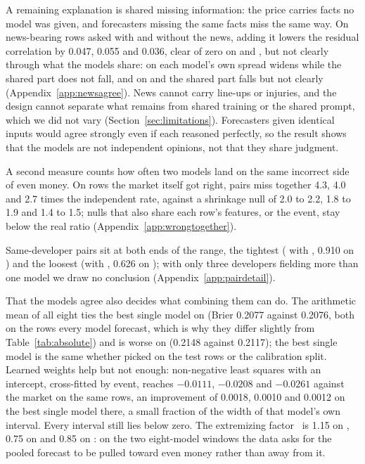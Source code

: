A remaining explanation is shared missing information: the price carries facts
no model was given, and forecasters missing the same facts miss the same way. On
news-bearing rows asked with and without the news, adding it lowers the
residual correlation by 0.047, 0.055 and 0.036, clear of zero on \winA and
\winB, but not clearly through what the models share: on \winA each model's own
spread widens while the shared part does not fall, and on \winB and \winC the
shared part falls but not clearly (Appendix~\ref{app:newsagree}). News cannot
carry line-ups or injuries, and the design cannot separate what remains from
shared training or the shared prompt, which we did not vary
(Section~\ref{sec:limitations}). Forecasters given identical inputs
would agree strongly even if each reasoned perfectly, so the result shows that
the models are not independent opinions, not that they share judgment.

A second measure counts how often two models land on the same incorrect side of
even money. On rows the market itself got right, pairs miss together 4.3, 4.0 and
2.7 times the independent rate, against a shrinkage null of 2.0 to 2.2, 1.8 to
1.9 and 1.4 to 1.5; nulls that also share each row's features, or the event,
stay below the real ratio (Appendix~\ref{app:wrongtogether}).

Same-developer pairs sit at both ends of the range, the tightest (\mKimiKTwoFive
with \mKimiKTwoSix, 0.910 on \winB) and the loosest (\mGptFiveFive with \mGptOss,
0.626 on \winC); with only three developers fielding more than one model we
draw no conclusion
(Appendix~\ref{app:pairdetail}).

That the models agree also decides what combining them can do. The arithmetic
mean of all eight ties the best single model on \winB (Brier 0.2077 against
0.2076, both on the rows every model forecast, which is why they differ slightly
from Table~\ref{tab:absolute}) and is worse on \winC (0.2148 against 0.2117);
the best single model is the same whether picked on the test rows or the
calibration split.
Learned weights help but not enough: non-negative least squares with an intercept, cross-fitted by event, reaches
$-0.0111$, $-0.0208$ and $-0.0261$ against the market on the same rows, an
improvement of 0.0018, 0.0010 and 0.0012 on the best single model there, a small fraction of the width of that model's
own interval. Every interval still lies below zero.
The extremizing factor~\citep{baron2014,satopaa2016} is 1.15 on \winA,
0.75 on \winB and 0.85 on \winC: on the two eight-model windows the data asks
for the pooled forecast to be pulled toward even money rather than away from it.

